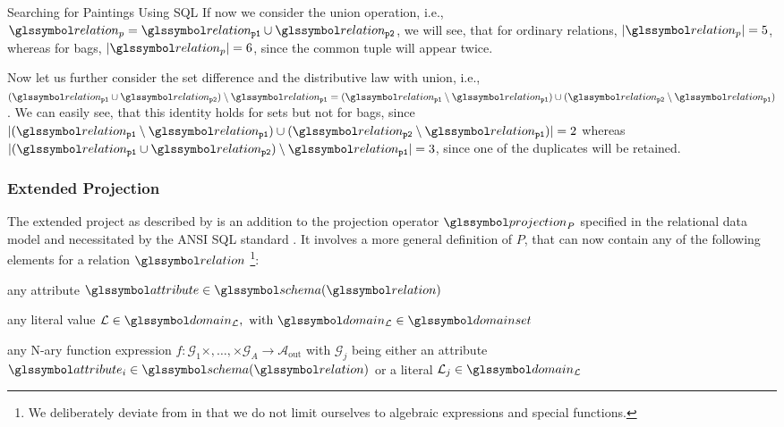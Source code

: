 \begin{example}[label=example:bag_vs_set]{Searching for Paintings Using SQL}{}
    If now we consider the union operation, i.e., $\relation_{p} = \relation_{\mathtt{p1}} \cup \relation_{\mathtt{p2}}$, we will see, that for ordinary relations, $|\relation_{p}| = 5$, whereas for bags, $|\relation_{p}| = 6$, since the common tuple will appear twice.

    Now let us further consider the set difference and the distributive law with union, i.e., $(\relation_{\mathtt{p1}} \cup \relation_{\mathtt{p2}}) \setminus \relation_{\mathtt{p1}} = (\relation_{\mathtt{p1}} \setminus \relation_{\mathtt{p1}}) \cup (\relation_{\mathtt{p2}} \setminus \relation_{\mathtt{p1}})$. We can easily see, that this identity holds for sets but not for bags, since $|(\relation_{\mathtt{p1}} \setminus \relation_{\mathtt{p1}}) \cup (\relation_{\mathtt{p2}} \setminus \relation_{\mathtt{p1}})| = 2$ whereas $|(\relation_{\mathtt{p1}} \cup \relation_{\mathtt{p2}}) \setminus \relation_{\mathtt{p1}}| = 3$, since one of the duplicates will be retained.
\end{example}

\subsubsection{Extended Projection}

The extended project as described by \cite{Garcia:2009Database} is an addition to the projection operator $\projection_{P}$ specified in the relational data model and necessitated by the ANSI SQL standard \cite[]{XOpen:1996SQL}. It involves a more general definition of $P$, that can now contain any of the following elements for a relation $\relation$ \footnote{We deliberately deviate from \cite{Garcia:2009Database} in that we do not limit ourselves to algebraic expressions and special functions.}:
\begin{enumerate*}[label=(\roman*),itemjoin={{, }}, itemjoin*={{, or, }}, after={{.}}]
    \item any attribute $\attribute \in \schema(\relation)$
    \item any literal value $\mathcal{L} \in \domain_{\mathcal{L}}, \text{ with } \domain_{\mathcal{L}} \in \domainset$
    \item any N-ary function expression $f \colon \mathcal{G}_1 \times, \ldots, \times \mathcal{G}_A \rightarrow \mathcal{A}_{\text{out}}$ with $\mathcal{G}_j$ being either an attribute $\attribute_i \in \schema(\relation)$ or a literal $\mathcal{L}_j \in \domain_{\mathcal{L}}$
\end{enumerate*}

